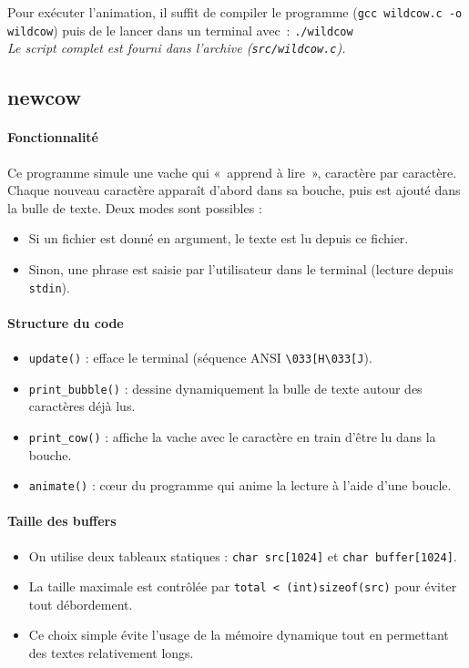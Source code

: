 \documentclass[a4paper,french,11pt]{article}
\begin{document}
\medskip
\noindent Pour exécuter l’animation, il suffit de compiler le programme (\texttt{gcc wildcow.c -o wildcow}) puis de le lancer dans un terminal avec : \texttt{./wildcow}
\medskip
\\\noindent\emph{Le script complet est fourni dans l’archive (\texttt{src/wildcow.c}).}

\newpage

\subsection{newcow}

\paragraph{Fonctionnalité}
Ce programme simule une vache qui « apprend à lire », caractère par caractère. Chaque nouveau caractère apparaît d’abord dans sa bouche, puis est ajouté dans la bulle de texte. Deux modes sont possibles :
\begin{itemize}
\item Si un fichier est donné en argument, le texte est lu depuis ce fichier.
\item Sinon, une phrase est saisie par l’utilisateur dans le terminal (lecture depuis \texttt{stdin}).
\end{itemize}

\paragraph{Structure du code}
\begin{itemize}
\item \texttt{update()} : efface le terminal (séquence ANSI \verb|\033[H\033[J|).
\item \texttt{print\_bubble()} : dessine dynamiquement la bulle de texte autour des caractères déjà lus.
\item \texttt{print\_cow()} : affiche la vache avec le caractère en train d’être lu dans la bouche.
\item \texttt{animate()} : cœur du programme qui anime la lecture à l’aide d’une boucle.
\end{itemize}

\paragraph{Taille des buffers}
\begin{itemize}
\item On utilise deux tableaux statiques : \texttt{char src[1024]} et \texttt{char buffer[1024]}.
\item La taille maximale est contrôlée par \texttt{total < (int)sizeof(src)} pour éviter tout débordement.
\item Ce choix simple évite l’usage de la mémoire dynamique tout en permettant des textes relativement longs.
\end{itemize}
\end{document}
